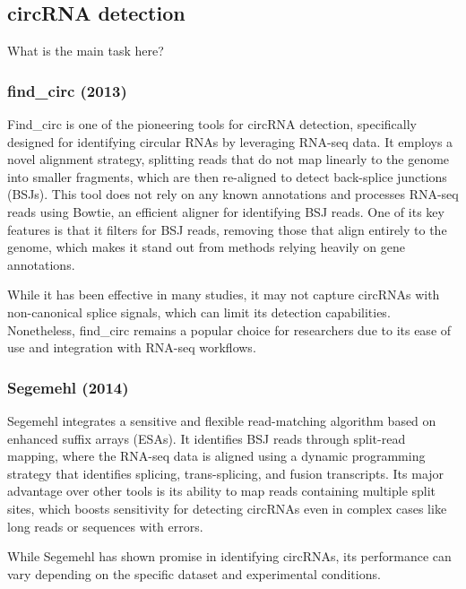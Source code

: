 \subsection{circRNA detection}
\label{subsec:circrna_detection}
What is the main task here?

\subsubsection{find\_circ (2013)\supercite{memczak_circular_2013}}
Find\_circ is one of the pioneering tools for circRNA detection, specifically
designed for identifying circular RNAs by leveraging RNA-seq data.
It employs a novel alignment strategy, splitting reads that do not map linearly
to the genome into smaller fragments, which are then re-aligned to detect
back-splice junctions (BSJs)\supercite{memczak_circular_2013}.
This tool does not rely on any known annotations and processes RNA-seq reads
using Bowtie, an efficient aligner for identifying BSJ reads.
One of its key features is that it filters for BSJ reads, removing those that
align entirely to the genome, which makes it stand out from methods relying
heavily on gene annotations\supercite{memczak_circular_2013}.

While it has been effective in many studies, it may not capture circRNAs with
non-canonical splice signals, which can limit its detection
capabilities\supercite{sekar_circular_2018,liu_prkra_2022}.
Nonetheless, find\_circ remains a popular choice for researchers due to its
ease of use and integration with RNA-seq workflows.

\subsubsection{Segemehl (2014)\supercite{hoffmann_multi-split_2014}}
Segemehl integrates a sensitive and flexible read-matching algorithm based on
enhanced suffix arrays (ESAs).
It identifies BSJ reads through split-read mapping, where the RNA-seq data is
aligned using a dynamic programming strategy that identifies splicing,
trans-splicing, and fusion transcripts.
Its major advantage over other tools is its ability to map reads containing
multiple split sites, which boosts sensitivity for detecting circRNAs even in
complex cases like long reads or sequences with
errors\supercite{hoffmann_multi-split_2014}.

While Segemehl has shown promise in identifying circRNAs, its performance can
vary depending on the specific dataset and experimental
conditions\supercite{gao_ciri_2015,zeng_comprehensive_2017}.

